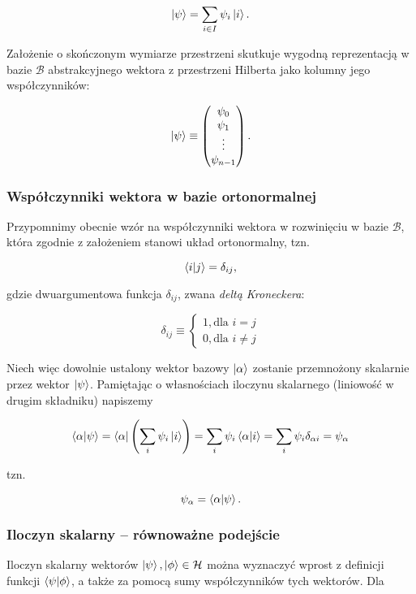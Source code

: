 $$
    \ket{\psi} = \sum\limits_{i \in I} \psi_{i}\ket{i}.
$$

Założenie o skończonym wymiarze przestrzeni skutkuje wygodną reprezentacją w bazie $\mathcal{B}$ abstrakcyjnego wektora z przestrzeni Hilberta jako kolumny jego współczynników: 

$$
    \ket{\psi} \equiv
    \begin{pmatrix}
        \psi_{0} \\
        \psi_{1} \\
        \vdots \\
        \psi_{n - 1} \\
    \end{pmatrix}.
$$

\subsubsection{Współczynniki wektora w bazie ortonormalnej}
\label{coefficients}

Przypomnimy obecnie wzór na współczynniki wektora w rozwinięciu w bazie $\mathcal{B}$, która zgodnie z założeniem stanowi układ ortonormalny, tzn. 

$$
    \bra{i}\ket{j} = \delta_{ij},
$$

gdzie dwuargumentowa funkcja $\delta_{ij}$, zwana \textit{deltą Kroneckera}:

$$
    \delta_{ij} \equiv
    \begin{cases}
        1, \text{dla } i = j \\
        0, \text{dla } i \neq j
    \end{cases}
$$

Niech więc dowolnie ustalony wektor bazowy $\ket{\alpha}$ zostanie przemnożony skalarnie przez wektor $\ket{\psi}$. Pamiętając o własnościach iloczynu skalarnego (liniowość w drugim składniku) napiszemy 

$$
    \bra{\alpha}\ket{\psi} = \bra{\alpha}\left(\sum\limits_{i}\psi_{i}\ket{i}\right) = \sum\limits_{i}\psi_{i} \bra{\alpha}\ket{i} = \sum\limits_{i}\psi_{i}\delta_{\alpha i}=\psi_{\alpha}
$$

tzn.

$$
    \psi_{\alpha}=\bra{\alpha}\ket{\psi}.
$$

\subsubsection{Iloczyn skalarny -- równoważne podejście}

Iloczyn skalarny wektorów $\ket{\psi}, \ket{\phi} \in \mathcal{H}$ można wyznaczyć wprost z definicji funkcji $\bra{\psi}\ket{\phi}$, a także za pomocą sumy współczynników tych wektorów. Dla

